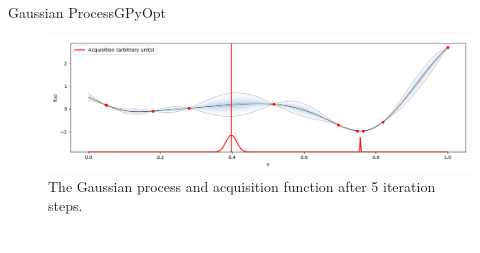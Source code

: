 \documentclass{beamer}
\begin{document}
\begin{frame}{Gaussian Process}{GPyOpt}


\begin{figure}[!t]
	\centering  
	\includegraphics[scale=0.3]{bopt.png}
	\caption{The Gaussian process and acquisition function after 5 iteration steps.}
\end{figure}

\end{frame}


\bgroup
{}
\begin{frame}[t,plain]{}{}
  \begin{center}
    {\tiny \textcolor{white}{The End}}
  \end{center}
\end{frame}
\egroup
\end{document}
